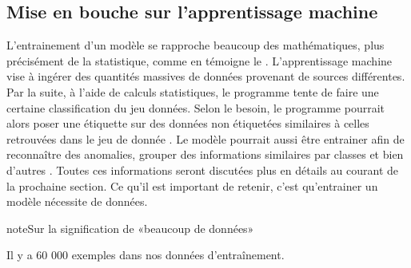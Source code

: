 \documentclass[letterpaper,10pt,french]{sphinxmanual}
\begin{document}
\subsection{Mise en bouche sur l’apprentissage machine}
\label{\detokenize{preprocessing:mise-en-bouche-sur-lapprentissage-machine}}
L’entrainement d’un modèle se rapproche beaucoup des mathématiques, plus précisément de la statistique, comme en témoigne le  . L’apprentissage machine vise à ingérer des quantités massives de données provenant de sources différentes. Par la suite, à l’aide de calculs statistiques, le programme tente de faire une certaine classification du jeu données. Selon le besoin, le programme pourrait alors poser une étiquette sur des données non étiquetées similaires à celles retrouvées dans le jeu de donnée .   Le modèle pourrait aussi être entrainer afin de reconnaître des anomalies, grouper des informations similaires par classes et bien d’autres . Toutes ces informations seront discutées plus en détails au courant de la prochaine section. Ce qu’il est important de retenir, c’est qu’entrainer un modèle nécessite  de données.

\begin{sphinxadmonition}{note}{Sur la signification de «beaucoup de données»}

Il y a 60 000 exemples dans nos données d’entraînement.

\begin{sphinxVerbatim}[commandchars=\\\{\}]
 \PYG{p}{[} \PYG{p}{]} 
\PYG{p}{[} \PYG{p}{]}   
\end{sphinxVerbatim}
\end{sphinxadmonition}
\end{document}
